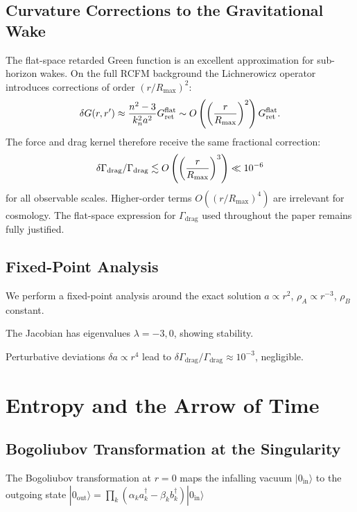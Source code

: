 \documentclass[10pt,twocolumn]{article}
\theoremstyle{definition}
\newcommand{\rhoA}{\rho_{A}}
\newcommand{\rhoB}{\rho_{B}}
\newcommand{\Gammadrag}{\Gamma_{\mathrm{drag}}}
\begin{document}
\subsection{Curvature Corrections to the Gravitational Wake}

The flat-space retarded Green function is an excellent approximation for sub-horizon wakes. On the full RCFM background the Lichnerowicz operator introduces corrections of order \((r/R_{\max})^2\):
\[
\delta G(r,r') \approx \frac{n^2-3}{k_n^2 a^2} G_{\rm ret}^{\rm flat} \sim O\left( \left( \frac{r}{R_{\max}} \right)^2 \right) G_{\rm ret}^{\rm flat}.
\]
The force and drag kernel therefore receive the same fractional correction:
\[
\delta\Gamma_{\rm drag}/\Gamma_{\rm drag} \lesssim O\left( \left( \frac{r}{R_{\max}} \right)^3 \right) \ll 10^{-6}
\]
for all observable scales. Higher-order terms \(O((r/R_{\max})^4)\) are irrelevant for cosmology. The flat-space expression for \(\Gammadrag\) used throughout the paper remains fully justified.



\subsection{Fixed-Point Analysis}

We perform a fixed-point analysis around the exact solution \( a \propto r^{2} \), \( \rhoA \propto r^{-3} \), \( \rhoB \) constant.

The Jacobian has eigenvalues \( \lambda = -3, 0 \), showing stability.

Perturbative deviations \( \delta a \propto r^{4} \) lead to \( \delta \Gammadrag / \Gammadrag \approx 10^{-3} \), negligible.

\section{Entropy and the Arrow of Time}
\label{sec:entropy}

\subsection{Bogoliubov Transformation at the Singularity}

The Bogoliubov transformation at \( r=0 \) maps the infalling vacuum \( |0_{\mathrm{in}}\rangle \) to the outgoing state \( |0_{\mathrm{out}}\rangle = \prod_{k} (\alpha_{k} a_{k}^{\dagger} - \beta_{k} b_{k}^{\dagger}) |0_{\mathrm{in}}\rangle \)
\end{document}
